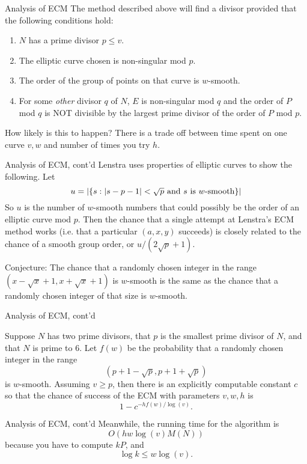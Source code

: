 \documentclass{beamer}
\begin{document}
\begin{frame}{Analysis of ECM}
The method described above will find a divisor provided that the following conditions hold:
\begin{enumerate}
\item $N$ has a prime divisor $p\le v$.
\item The elliptic curve chosen is non-singular mod $p$.
\item The order of the group of points on that curve is $w$-smooth.
\item For some \textit{other} divisor $q$ of $N$, $E$ is non-singular mod $q$ and the order of $P$ mod $q$ is NOT divisible by the
largest prime divisor of the order of $P$ mod $p$. 
\end{enumerate}

How likely is this to happen?  There is a trade off between time spent on one curve $v,w$ and number of times you try $h$.

\end{frame}
\begin{frame}{Analysis of ECM, cont'd}
Lenstra uses  properties of elliptic curves to show the following. Let
$$
u=|\{ s: |s-p-1|<\sqrt{p} \hbox{\rm\ and $s$ is $w$-smooth}\}| 
$$
So $u$ is the number of $w$-smooth numbers that could possibly be the order of an elliptic curve mod $p$.
Then the chance that a single attempt at Lenstra's ECM method works (i.e. that a particular $(a,x,y)$ succeeds) is closely related to
the chance of a smooth group order, or $u/(2\sqrt{p}+1)$. 

\bigskip\noindent
Conjecture: The chance that a randomly chosen integer in the range $(x-\sqrt{x}+1,x+\sqrt{x}+1)$ is $w$-smooth is the same
as the chance that a randomly chosen integer of that size is $w$-smooth.
\end{frame}
\begin{frame}{Analysis of ECM, cont'd}
\begin{theorem} Suppose $N$ has two prime divisors, that $p$ is the smallest prime divisor of $N$, and that $N$ is prime to $6$.
Let $f(w)$ be the probability that a randomly chosen integer in the range $$(p+1-\sqrt{p},p+1+\sqrt{p})$$
is $w$-smooth.  Assuming $v\ge p$,
then there is an explicitly computable constant $c$ so that the chance of success of the ECM with parameters $v,w,h$
is 
$$1-c^{-hf(w)/\log(v)}.$$
\end{theorem}
\end{frame}
\begin{frame}{Analysis of ECM, cont'd}
\bigskip\noindent
Meanwhile, the running time for the algorithm is 
$$O(hw\log(v)M(N))$$
 because you have to compute $kP$,
and 
$$
\log k\le w\log(v).
$$
\end{frame}
\end{document}
